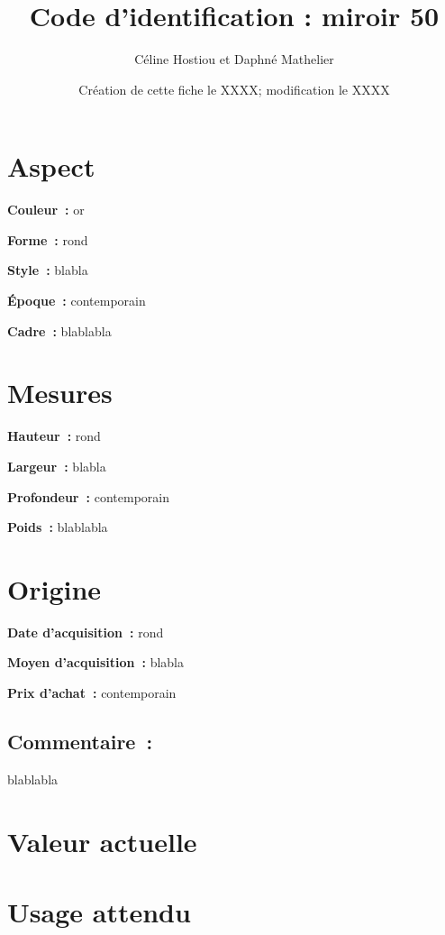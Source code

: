 
    \date{Création de cette fiche
    le XXXX; modification le XXXX}
\author{Céline Hostiou et Daphné Mathelier}
\title {Code d'identification : miroir 50}

\maketitle

\begin{center}

\end{center}

\hr
\section*{Aspect}
{\bf \large Couleur :} or
      
{\bf \large Forme :} rond 
      
{\bf \large Style :} blabla
      
{\bf \large Époque :} contemporain
      
{\bf \large Cadre :} blablabla
    
\section*{Mesures}
{\bf \large Hauteur :} rond 
      
{\bf \large Largeur :} blabla
      
{\bf \large Profondeur :} contemporain
      
{\bf \large Poids :} blablabla
 
 \section*{Origine}
 
 {\bf \large Date d’acquisition :} rond 
      
{\bf \large Moyen d’acquisition :} blabla
      
{\bf \large Prix d’achat :} contemporain
      
\subsection*{Commentaire :} blablabla
 
 \section*{Valeur actuelle}
 
\section*{Usage attendu}
 

